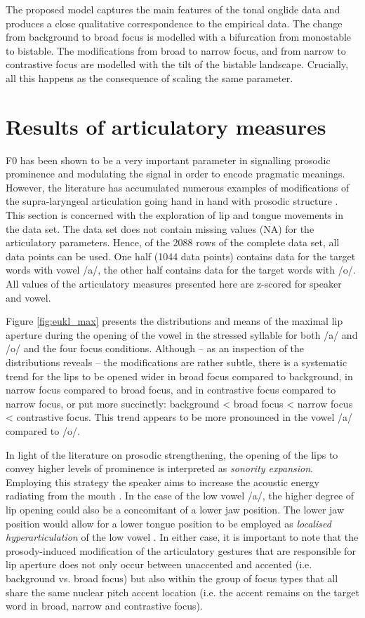 The proposed model captures the main features of the tonal onglide data and produces a close qualitative correspondence to the empirical data. The change from background to broad focus is modelled with a bifurcation from monostable to bistable. The modifications from broad to narrow focus, and from narrow to contrastive focus are modelled with the tilt of the bistable landscape. Crucially, all this happens as the consequence of scaling the same parameter.

\section{Results of articulatory measures}

F0 has been shown to be a very important parameter in signalling prosodic prominence and modulating the signal in order to encode pragmatic meanings. However, the literature has accumulated numerous examples of modifications of the supra-laryngeal articulation going hand in hand with prosodic structure \citep[for overviews see][]{Cho2011, Mücke2018}. This section is concerned with the exploration of lip and tongue movements in the data set. The data set does not contain missing values (NA) for the articulatory parameters. Hence, of the 2088 rows of the complete data set, all data points can be used. One half (1044 data points) contains data for the target words with vowel /a/, the other half contains data for the target words with /o/. All values of the articulatory measures presented here are z-scored for speaker and vowel.

Figure \ref{fig:eukl_max} presents the distributions and means of the maximal lip aperture during the opening of the vowel in the stressed syllable for both /a/ and /o/ and the four focus conditions. Although -- as an inspection of the distributions reveals -- the modifications are rather subtle, there is a systematic trend for the lips to be opened wider in broad focus compared to background, in narrow focus compared to broad focus, and in contrastive focus compared to narrow focus, or put more succinctly: background < broad focus < narrow focus < contrastive focus. This trend appears to be more pronounced in the vowel /a/ compared to /o/.

In light of the literature on prosodic strengthening, the opening of the lips to convey higher levels of prominence is interpreted as \emph{sonority expansion}. Employing this strategy the speaker aims to increase the acoustic energy radiating from the mouth \citep{BeckmanEdwardsFletcher1992}. In the case of the low vowel /a/, the higher degree of lip opening could also be a concomitant of a lower jaw position. The lower jaw position would allow for a lower tongue position to be employed as \emph{localised hyperarticulation} of the low vowel \citep{DeJong1995}. In either case, it is important to note that the prosody-induced modification of the articulatory gestures that are responsible for lip aperture does not only occur between unaccented and accented (i.e. background vs. broad focus) but also within the group of focus types that all share the same nuclear pitch accent location (i.e. the accent remains on the target word in broad, narrow and contrastive focus).

